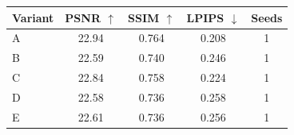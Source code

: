 \begin{tabular}{lcccc}
\toprule
Variant & PSNR $\uparrow$ & SSIM $\uparrow$ & LPIPS $\downarrow$ & Seeds \\
\midrule
A & 22.94 & 0.764 & 0.208 & 1 \\
B & 22.59 & 0.740 & 0.246 & 1 \\
C & 22.84 & 0.758 & 0.224 & 1 \\
D & 22.58 & 0.736 & 0.258 & 1 \\
E & 22.61 & 0.736 & 0.256 & 1 \\
\bottomrule
\end{tabular}
